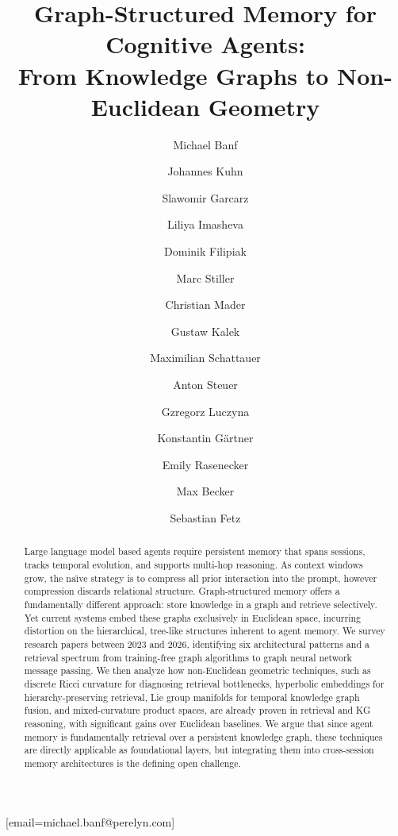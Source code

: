 \documentclass[hf]{ceurart}
\begin{document}


\title{Graph-Structured Memory for Cognitive Agents:\\
  From Knowledge Graphs to Non-Euclidean Geometry}

\author{Michael Banf}[email=michael.banf@perelyn.com]
\author{Johannes Kuhn}
\author{Slawomir Garcarz}
\author{Liliya Imasheva}
\author{Dominik Filipiak}
\author{Marc Stiller}
\author{Christian Mader}
\author{Gustaw Kalek}
\author{Maximilian Schattauer}
\author{Anton Steuer}
\author{Gzregorz Luczyna}
\author{Konstantin Gärtner}
\author{Emily Rasenecker}
\author{Max Becker}
\author{Sebastian Fetz}

\address{Perelyn GmbH, Munich, Germany}

\begin{abstract}
Large language model based agents require persistent memory that
spans sessions, tracks temporal evolution, and supports multi-hop
reasoning. As context windows grow, the na\"{\i}ve strategy is to
compress all prior interaction into the prompt, however compression
discards relational structure. Graph-structured memory offers a
fundamentally different approach: store knowledge in a graph and
retrieve selectively. Yet current systems embed these graphs
exclusively in Euclidean space, incurring distortion on the
hierarchical, tree-like structures inherent to agent memory.
We survey research papers between 2023 and 2026, identifying six
architectural patterns and a retrieval spectrum from training-free
graph algorithms to graph neural network message passing. We then analyze how
non-Euclidean geometric techniques, such as discrete Ricci curvature for
diagnosing retrieval bottlenecks, hyperbolic embeddings for
hierarchy-preserving retrieval, Lie group manifolds for temporal
knowledge graph fusion, and mixed-curvature product spaces, are
already proven in retrieval and KG reasoning, with significant gains
over Euclidean baselines. We argue that since agent memory is fundamentally
retrieval over a persistent knowledge graph, these techniques are
directly applicable as foundational layers, but integrating them into
cross-session memory architectures is the defining open challenge.
\end{abstract}
\end{document}
